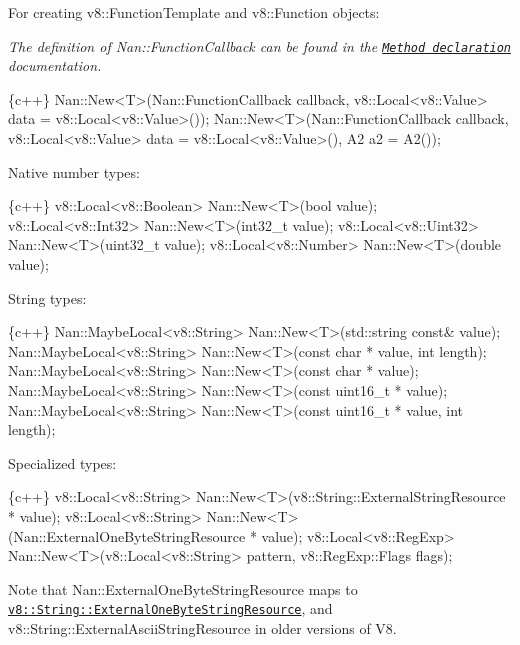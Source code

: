 For creating {\ttfamily v8\+::\+Function\+Template} and {\ttfamily v8\+::\+Function} objects\+:

{\itshape The definition of {\ttfamily Nan\+::\+Function\+Callback} can be found in the \href{./methods.md#api_nan_method}{\tt Method declaration} documentation.}


\begin{DoxyCode}
\{c++\}
Nan::New<T>(Nan::FunctionCallback callback,
            v8::Local<v8::Value> data = v8::Local<v8::Value>());
Nan::New<T>(Nan::FunctionCallback callback,
            v8::Local<v8::Value> data = v8::Local<v8::Value>(),
            A2 a2 = A2());
\end{DoxyCode}


Native number types\+:


\begin{DoxyCode}
\{c++\}
v8::Local<v8::Boolean> Nan::New<T>(bool value);
v8::Local<v8::Int32> Nan::New<T>(int32\_t value);
v8::Local<v8::Uint32> Nan::New<T>(uint32\_t value);
v8::Local<v8::Number> Nan::New<T>(double value);
\end{DoxyCode}


String types\+:


\begin{DoxyCode}
\{c++\}
Nan::MaybeLocal<v8::String> Nan::New<T>(std::string const& value);
Nan::MaybeLocal<v8::String> Nan::New<T>(const char * value, int length);
Nan::MaybeLocal<v8::String> Nan::New<T>(const char * value);
Nan::MaybeLocal<v8::String> Nan::New<T>(const uint16\_t * value);
Nan::MaybeLocal<v8::String> Nan::New<T>(const uint16\_t * value, int length);
\end{DoxyCode}


Specialized types\+:


\begin{DoxyCode}
\{c++\}
v8::Local<v8::String> Nan::New<T>(v8::String::ExternalStringResource * value);
v8::Local<v8::String> Nan::New<T>(Nan::ExternalOneByteStringResource * value);
v8::Local<v8::RegExp> Nan::New<T>(v8::Local<v8::String> pattern, v8::RegExp::Flags flags);
\end{DoxyCode}


Note that {\ttfamily Nan\+::\+External\+One\+Byte\+String\+Resource} maps to \href{https://v8docs.nodesource.com/io.js-3.0/d9/db3/classv8_1_1_string_1_1_external_one_byte_string_resource.html}{\tt {\ttfamily v8\+::\+String\+::\+External\+One\+Byte\+String\+Resource}}, and {\ttfamily v8\+::\+String\+::\+External\+Ascii\+String\+Resource} in older versions of V8.

